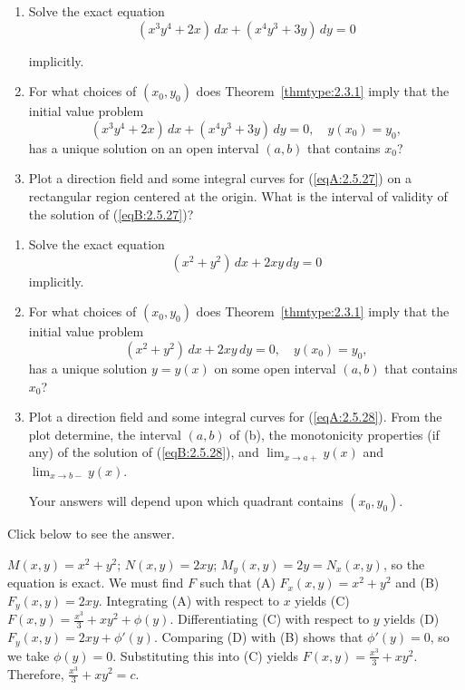\documentclass{ximera}
\begin{document}
\begin{problem}\label{exer:2.5.27}
\begin{enumerate}
\item %
Solve the exact equation
\begin{equation}\label{eqA:2.5.27}
(x^3y^4+2x)\,dx+(x^4y^3+3y)\,dy=0
\end{equation}

implicitly.
\item %
For what choices of $(x_0,y_0)$ does
Theorem~\ref{thmtype:2.3.1} imply that the initial value problem
\begin{equation}\label{eqB:2.5.27}
(x^3y^4+2x)\,dx+(x^4y^3+3y)\,dy=0,\quad y(x_0)=y_0,
\end{equation}
has a unique solution on an open interval $(a,b)$  that contains $x_0$?
\item %
Plot a direction field and some integral curves for (\ref{eqA:2.5.27})
on a rectangular region centered at the origin. What is the
 interval of validity of the solution of (\ref{eqB:2.5.27})?
\end{enumerate}
\end{problem}

\begin{problem}\label{exer:2.5.28}
\begin{enumerate}
\item %
Solve the exact equation
\begin{equation}\label{eqA:2.5.28}
(x^2+y^2)\,dx+2xy\,dy=0
\end{equation}
implicitly.
\item %
For what choices of $(x_0,y_0)$ does
Theorem~\ref{thmtype:2.3.1} imply that the initial value problem
\begin{equation}\label{eqB:2.5.28}
(x^2+y^2)\,dx+2xy\,dy=0,\quad y(x_0)=y_0,
\end{equation}
has a unique solution $y=y(x)$ on some open interval $(a,b)$
that contains $x_0$?
\item %
Plot a direction field and some integral curves for (\ref{eqA:2.5.28}). From
the plot determine,
the  interval $(a,b)$ of (b), the monotonicity
properties (if any) of the solution of (\ref{eqB:2.5.28}), and $\lim_{x\to a+}y(x)$ and $\lim_{x\to b-}y(x)$. 
\begin{hint}Your answers will
depend upon which quadrant contains $(x_0,y_0)$.
\end{hint}
\end{enumerate}

Click below to see the answer.

\begin{expandable}
    $M(x,y)=x^2+y^2$;\;
$N(x,y)=2xy$;\;
$M_y(x,y)=2y=N_x(x,y)$,
so the  equation is exact.
We must find $F$ such that
(A) $F_x(x,y)=x^2+y^2$ and
(B) $F_y(x,y)=2xy$.
Integrating (A) with respect to $x$ yields
(C) $F(x,y)=\frac{x^3}{3}+xy^2+\phi(y)$.
Differentiating (C) with respect to $y$  yields
(D) $F_y(x,y)=2xy+\phi'(y)$.
Comparing (D) with (B)  shows that
$\phi'(y)=0$, so we take
$\phi(y)=0$.
Substituting this into (C) yields
$F(x,y)=\frac{x^3}{3}+xy^2$.
Therefore, $\frac{x^3}{3}+xy^2=c$.
\end{expandable}
\end{problem}
\end{document}
